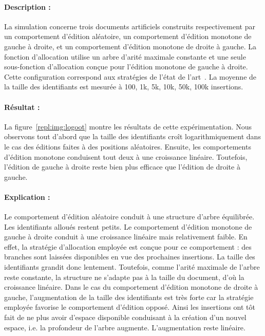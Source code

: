 \paragraph{Description :} La simulation concerne trois documents artificiels
construits respectivement par un comportement d'édition aléatoire, un
comportement d'édition monotone de gauche à droite, et un comportement d'édition
monotone de droite à gauche. La fonction d'allocation utilise un arbre d'arité
maximale constante et une seule sous-fonction d'allocation conçue pour l'édition
monotone de gauche à droite. Cette configuration correspond aux stratégies de
l'état de l'art~\cite{preguica2009commutative, weiss2009logoot}.  La moyenne de
la taille des identifiants est mesurée à 100, 1k, 5k, 10k, 50k, 100k insertions.

\paragraph{Résultat :} La figure~\ref{repl:img:logoot} montre les résultats de
cette expérimentation. Nous observons tout d'abord que la taille des
identifiants croît logarithmiquement dans le cas des éditions faites à des
positions aléatoires. Ensuite, les comportements d'édition monotone conduisent
tout deux à une croissance linéaire. Toutefois, l'édition de gauche à droite
reste bien plus efficace que l'édition de droite à gauche.

\paragraph{Explication :} Le comportement d'édition aléatoire conduit à une
structure d'arbre équilibrée. Les identifiants alloués restent petits. Le
comportement d'édition monotone de gauche à droite conduit à une croissance
linéaire mais relativement faible. En effet, la stratégie d'allocation employée
est conçue pour ce comportement : des branches sont laissées disponibles en vue
des prochaines insertions. La taille des identifiants grandit donc
lentement. Toutefois, comme l'arité maximale de l'arbre reste constante, la
structure ne s'adapte pas à la taille du document, d'où la croissance
linéaire. Dans le cas du comportement d'édition monotone de droite à gauche,
l'augmentation de la taille des identifiants est très forte car la stratégie
employée favorise le comportement d'édition opposé. Ainsi les insertions ont tôt
fait de ne plus avoir d'espace disponible conduisant à la création d'un nouvel
espace, i.e. la profondeur de l'arbre augmente. L'augmentation reste linéaire.


